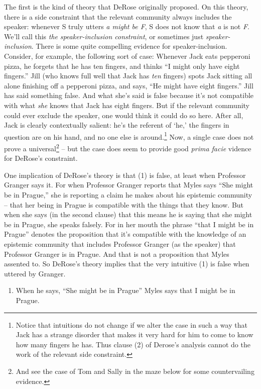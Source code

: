 The first is the kind of theory that DeRose originally proposed. On this theory, there is a side constraint that the relevant community always includes the speaker: whenever S truly utters \textit{a might be F}, S does not know that \textit{a} is not \textit{F}. We'll call this \textit{the} \textit{speaker-inclusion constraint}, or sometimes just \textit{speaker-inclusion}. There is some quite compelling evidence for speaker-inclusion. Consider, for example, the following sort of case: Whenever Jack eats pepperoni pizza, he forgets that he has ten fingers, and thinks ``I might only have eight fingers.'' Jill (who knows full well that Jack has \textit{ten} fingers) spots Jack sitting all alone finishing off a pepperoni pizza, and says, ``He might have eight fingers.'' Jill has said something false. And what she's said is false because it's not compatible with what \textit{she }knows that Jack has eight fingers. But if the relevant community could ever exclude the speaker, one would think it could do so here. After all, Jack is clearly contextually salient: he's the referent of `he,' the fingers in question are on his hand, and no one else is around.\footnote{Notice that intuitions do not change if we alter the case in such a way that Jack has a strange disorder that makes it very hard for him to come to know how many fingers he has. Thus clause (2) of Derose's analysis cannot do the work of the relevant side constraint. } Now, a single case does not prove a universal\footnote{And see the case of Tom and Sally in the maze below for some countervailing evidence.} -- but the case does seem to provide good \textit{prima facie }vidence for DeRose's constraint.
 
One implication of DeRose's theory is that (1) is false, at least when Professor Granger says it. For when Professor Granger reports that Myles says ``She might be in Prague,'' she is reporting a claim he makes about his epistemic community -- that her being in Prague is compatible with the things that they know. But when she says (in the second clause) that this means he is saying that she might be in Prague, she speaks falsely. For in her mouth the phrase ``that I might be in Prague'' denotes the proposition that it's compatible with the knowledge of an epistemic community that includes Professor Granger (as the speaker) that Professor Granger is in Prague. And that is not a proposition that Myles assented to. So DeRose's theory implies that the very intuitive (1) is false when uttered by Granger. 
 
\begin{enumerate} 
\item When he says, ``She might be in Prague'' Myles says that I might be in Prague.
\end{enumerate}
 
